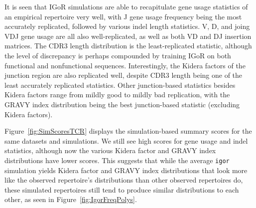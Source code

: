 \documentclass{article}
\begin{document}
It is seen that IGoR simulations are able to recapitulate gene usage statistics of an empirical repertoire very well, with J gene usage frequency being the most accurately replicated, followed by various indel length statistics.
V, D, and joing VDJ gene usage are all also well-replicated, as well as both VD and DJ insertion matrices.
The CDR3 length distribution is the least-replicated statistic, although the level of discrepancy is perhaps compounded by training IGoR on both functional and nonfunctional sequences.
Interestingly, the Kidera factors of the junction region are also replicated well, despite CDR3 length being one of the least accurately replicated statistics.
Other junction-based statistics besides Kidera factors range from mildly good to mildly bad replication, with the GRAVY index distribution being the best junction-based statistic (excluding Kidera factors).

Figure~\ref{fig:SimScoresTCR} displays the simulation-based summary scores for the same datasets and simulations.
We still see high scores for gene usage and indel statistics, although now the various Kidera factor and GRAVY index distributions have lower scores.
This suggests that while the average \texttt{igor} simulation yields Kidera factor and GRAVY index distributions that look more like the observed repertoire's distributions than other observed repertoires do, these simulated repertoires still tend to produce similar distributions to each other, as seen in Figure~\ref{fig:IgorFreqPolys}.
\end{document}

